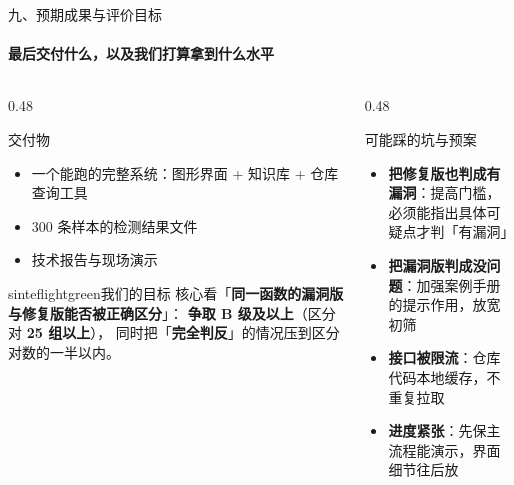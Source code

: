\documentclass{beamer}
\begin{document}
\begin{frame}{九、预期成果与评价目标}
\framesubtitle{最后交付什么，以及我们打算拿到什么水平}
\footnotesize
\begin{columns}[t]
\begin{column}{0.48\textwidth}
\begin{block}{交付物}
\begin{itemize}
\item 一个能跑的完整系统：图形界面 + 知识库 + 仓库查询工具
\item 300 条样本的检测结果文件
\item 技术报告与现场演示
\end{itemize}
\end{block}
\begin{colorblock}[black]{sinteflightgreen}{我们的目标}
核心看「\textbf{同一函数的漏洞版与修复版能否被正确区分}」：
\textbf{争取 B 级及以上}（区分对 \textbf{25 组以上}），
同时把「\textbf{完全判反}」的情况压到区分对数的一半以内。
\end{colorblock}
\end{column}
\begin{column}{0.48\textwidth}
\begin{block}{可能踩的坑与预案}
\begin{itemize}
\item \textbf{把修复版也判成有漏洞}：提高门槛，必须能指出具体可疑点才判「有漏洞」
\item \textbf{把漏洞版判成没问题}：加强案例手册的提示作用，放宽初筛
\item \textbf{接口被限流}：仓库代码本地缓存，不重复拉取
\item \textbf{进度紧张}：先保主流程能演示，界面细节往后放
\end{itemize}
\end{block}
\end{column}
\end{columns}
\end{frame}
\end{document}
